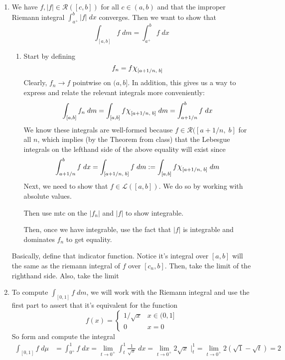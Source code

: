 \documentclass[12pt]{article}
\theoremstyle{plain}
\theoremstyle{definition}
\theoremstyle{remark}
\newcommand*{\Chi}{\mbox{\large$\chi$}} %
\begin{document}
\begin{enumerate}
\begin{enumerate}
\item We have $f,|f|\in\mathscr{R}([c,b])$ for all $c\in(a,b)$ and that the improper Riemann integral $\int^b_{a^+} |f| \; dx$ converges. Then we want to show that 
\[
    \int_{[a,b]} f \; dm = 
    \int^b_{a^+} f \; dx
\]
\begin{enumerate} 
\item 
Start by defining 
\[
    f_n = f \Chi_{[a+1/n,\;b]}
\]
Clearly, $f_n\rightarrow f$ pointwise on $(a,b]$. In addition, this gives us a way to express and relate the relevant integrals more conveniently:
\[
    \int_{[a,b]} f_n \; dm = 
    \int_{[a,b]} f \Chi_{[a+1/n,\;b]} \; dm = 
    \int_{a+1/n}^b f \; dx
\]
We know these integrals are well-formed because $f\in\mathscr{R}([a+1/n,\;b]$ for all $n$, which implies (by the Theorem from class) that the Lebesgue integrals on the lefthand side of the above equality will exist since 
\[
    \int_{a+1/n}^b f \; dx = 
    \int_{[a+1/n,\;b]} f \; dm := 
    \int_{[a,b]} f \Chi_{[a+1/n,\;b]} \; dm 
\]
Next, we need to show that $f\in\mathscr{L}([a,b])$. We do so by working with absolute values.

Then use mtc on the $|f_n|$ and $|f|$ to show integrable.

Then, once we have integrable, use the fact that $|f|$ is integrable and dominates $f_n$ to get equality.

\end{enumerate} 
Basically, define that indicator function. Notice it's integral over $[a,b]$ will the same as the riemann integral of $f$ over $[c_n,b]$. Then, take the limit of the righthand side. Also, take the limit 

\item To compute $\int_{[0,1]} f \; dm$, we will work with the Riemann integral and use the first part to assert that it's equivalent for the function 
\begin{equation}
    f(x) = \begin{cases} 1/\sqrt{x} & x \in (0,1] \\
        0 & x=0 \end{cases}
\end{equation}
So form and compute the integral
\begin{align*}
    \int_{[0,1]} f \; d\mu &= 
    \int_{0^+}^1 f \; dx = 
    \lim_{t\rightarrow 0^+}
    \int_{t}^1 \frac{1}{\sqrt{x}} \; dx 
    = \lim_{t\rightarrow 0^+}2 \sqrt{x}\; |^1_{t}
    = \lim_{t\rightarrow0^+}2(\sqrt{1} - \sqrt{t}) = 2
\end{align*}


\end{enumerate}
\end{enumerate}
\end{document}
